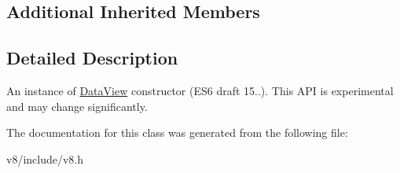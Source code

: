 \subsection*{Additional Inherited Members}


\subsection{Detailed Description}
An instance of \hyperlink{classv8_1_1DataView}{Data\+View} constructor (E\+S6 draft 15..). This A\+PI is experimental and may change significantly. 

The documentation for this class was generated from the following file\+:\begin{DoxyCompactItemize}
\item 
v8/include/v8.\+h\end{DoxyCompactItemize}
